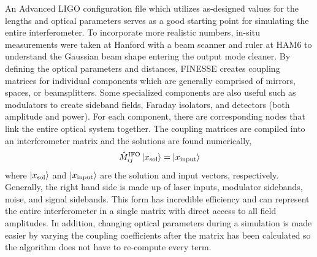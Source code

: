 	An Advanced LIGO configuration file \cite{FinesseH1} which utilizes as-designed values for the lengths and optical parameters serves as a good starting point for simulating the entire interferometer.  To incorporate more realistic numbers, in-situ measurements were taken at Hanford with a beam scanner and ruler at HAM6 to understand the Gaussian beam shape entering the output mode cleaner. By defining the optical parameters and distances, FINESSE creates coupling matrices for individual components which are generally comprised of mirrors, spaces, or beamsplitters.  Some specialized components are also useful such as modulators to create sideband fields, Faraday isolators, and detectors (both amplitude and power).  For each component, there are corresponding nodes that link the entire optical system together.  The coupling matrices are compiled into an interferometer matrix and the solutions are found numerically,
	\begin{equation}
	\hat{M}_{ij}^{\text{IFO}} \ket{x_{\text{sol}}} = \ket{x_{\text{input}}}
	\end{equation}
	where $\ket{x_{\text{sol}}}$ and $\ket{x_{\text{input}}}$ are the solution and input vectors, respectively. Generally, the right hand side is made up of laser inputs, modulator sidebands, noise, and signal sidebands. This form has incredible efficiency and can represent the entire interferometer in a single matrix with direct access to all field amplitudes.  In addition, changing optical parameters during a simulation is made easier by varying the coupling coefficients after the matrix has been calculated so the algorithm does not have to re-compute every term.
